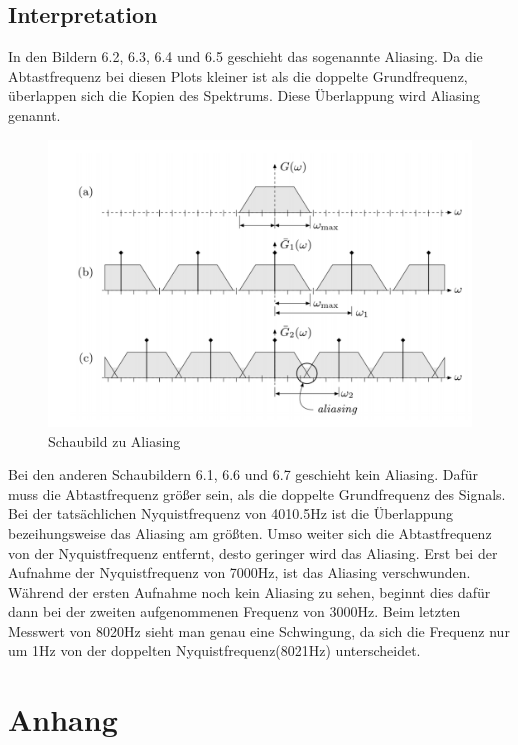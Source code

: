 \documentclass[12pt, oneside, a4paper, \docLanguage]{report}
\begin{document}
\section{Interpretation}
\label{chap:VERSUCH_5_INTERPRETATION}
In den Bildern 6.2, 6.3, 6.4 und 6.5 geschieht das sogenannte Aliasing.
\newline
Da die Abtastfrequenz bei diesen Plots kleiner ist als die doppelte Grundfrequenz, überlappen sich die Kopien des Spektrums.
\newline
Diese Überlappung wird Aliasing genannt.
\begin{figure}[hbt!]
	\centering
	\includegraphics[width=.65\linewidth]{media/aliasing}
	\caption{Schaubild zu Aliasing}
	\label{img:Aliasing}
\end{figure}
\newpage
Bei den anderen Schaubildern 6.1, 6.6 und 6.7 geschieht kein Aliasing. 
\newline
Dafür muss die Abtastfrequenz größer sein, als die doppelte Grundfrequenz des Signals.
Bei der tatsächlichen Nyquistfrequenz von 4010.5Hz ist die Überlappung bezeihungsweise das Aliasing am größten.
\newline
Umso weiter sich die Abtastfrequenz von der Nyquistfrequenz entfernt, desto geringer wird das Aliasing.
\newline
Erst bei der Aufnahme der Nyquistfrequenz von 7000Hz, ist das Aliasing verschwunden.
Während der ersten Aufnahme noch kein Aliasing zu sehen, beginnt dies dafür dann bei der zweiten aufgenommenen Frequenz von 3000Hz.
Beim letzten Messwert von 8020Hz sieht man genau eine Schwingung, da sich die Frequenz nur um 1Hz von der doppelten Nyquistfrequenz(8021Hz) unterscheidet.

%
%
\renewcommand\thesection{A.\arabic{section}}
\renewcommand\thesubsection{\thesection.\arabic{subsection}}

\chapter*{Anhang}
\label{chap:APPENDIX}
\addtocounter{chapter}{1}
\setcounter{section}{0}
\end{document}
